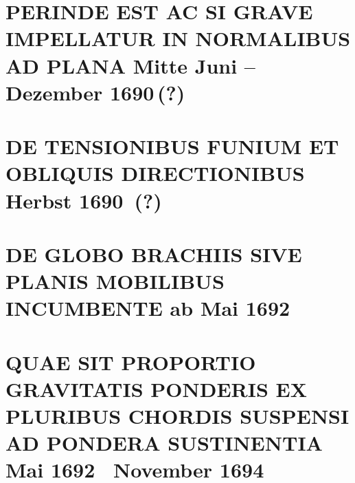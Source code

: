 \documentclass[%
fontsize=10pt,
]{scrbook}
\DeclareRobustCommand{\bracks}[1]{%
\textup{\lbrack}#1\textup{\rbrack}}
\begin{document}
\chapter[tocentry={Perinde est ac si grave impellatur in normalibus ad plana
\enskip \bracks{Mitte Juni -- Dezember 1690\,(?)}},
head={Perinde est ac si grave impellatur in normalibus ad plana}]
{\MakeUppercase{Perinde est ac si grave impellatur in normalibus ad plana}
\newline \bracks{Mitte Juni -- Dezember 1690\,(?)}}
\label{60114}
















\chapter[tocentry={De tensionibus funium et obliquis directionibus
\enskip \bracks{Herbst 1690~(?)}},
head={De tensionibus funium}]%
{\MakeUppercase{De tensionibus funium et obliquis directionibus}
\newline \bracks{Herbst 1690~(?)}}
\label{58943}




\chapter[tocentry={De globo brachiis sive planis mobilibus incumbente
\enskip \bracks{ab Mai 1692}},
head={De globo brachiis sive planis mobilibus incumbente}]
{\MakeUppercase{De globo brachiis sive planis mobilibus incumbente}
\newline \bracks{ab Mai 1692}}
\label{60110}

\chapter[tocentry={Quae sit proportio gravitatis ponderis ex pluribus chordis suspensi ad pondera sustinentia
\enskip \bracks{Mai 1692 \textendash\ November 1694}},
head={Gravitas ponderis ex pluribus chordis suspensi}]
{\MakeUppercase{Quae sit proportio gravitatis ponderis ex pluribus chordis suspensi ad pondera sustinentia}
\newline \bracks{Mai 1692 \textendash\ November 1694}}
\end{document}
